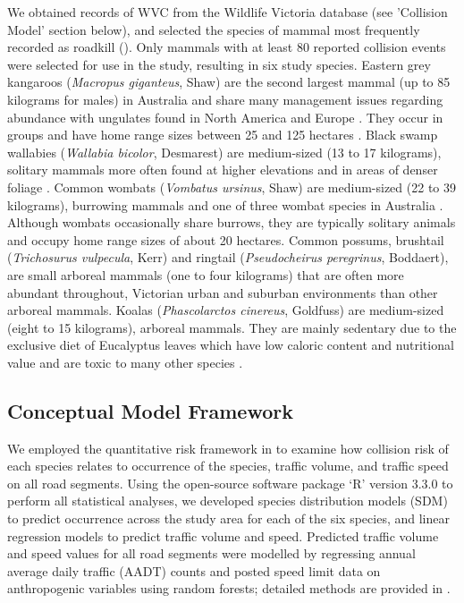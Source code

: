 We obtained records of WVC from the Wildlife Victoria database (see 'Collision Model' section below), and selected the species of mammal most frequently recorded as roadkill (). Only mammals with at least 80 reported collision events were selected for use in the study, resulting in six study species.  Eastern grey kangaroos (\textit{Macropus giganteus}, Shaw) are the second largest mammal (up to 85 kilograms for males) in Australia and share many management issues regarding abundance with ungulates found in North America and Europe \citep{crof04,coul10}. They occur in groups and have home range sizes between 25 and 125 hectares \citep{daws12}.  Black swamp wallabies (\textit{Wallabia bicolor}, Desmarest) are medium-sized (13 to 17 kilograms), solitary mammals more often found at higher elevations and in areas of denser foliage \citep{vand08}. Common wombats (\textit{Vombatus ursinus}, Shaw) are medium-sized (22 to 39 kilograms), burrowing mammals and one of three wombat species in Australia \citep{vand08}. Although wombats occasionally share burrows, they are typically solitary animals and occupy home range sizes of about 20 hectares. Common possums, brushtail (\textit{Trichosurus vulpecula}, Kerr) and ringtail (\textit{Pseudocheirus peregrinus}, Boddaert), are small arboreal mammals (one to four kilograms) that are often more abundant throughout, Victorian urban and suburban environments than other arboreal mammals.  Koalas (\textit{Phascolarctos cinereus}, Goldfuss) are medium-sized (eight to 15 kilograms), arboreal mammals.  They are mainly sedentary due to the exclusive diet of Eucalyptus leaves which have low caloric content and nutritional value and are toxic to many other species \citep{vand08}.

\subsection{Conceptual Model Framework}

We employed the quantitative risk framework in  to examine how collision risk of each species relates to occurrence of the species, traffic volume, and traffic speed on all road segments. Using the open-source software package `R' version 3.3.0 \citep{rdct16} to perform all statistical analyses, we developed species distribution models (SDM) to predict occurrence across the study area for each of the six species, and linear regression models to predict traffic volume and speed. Predicted traffic volume and speed values for all road segments were modelled by regressing annual average daily traffic (AADT) counts and posted speed limit data on anthropogenic variables using random forests; detailed methods are provided in . 

